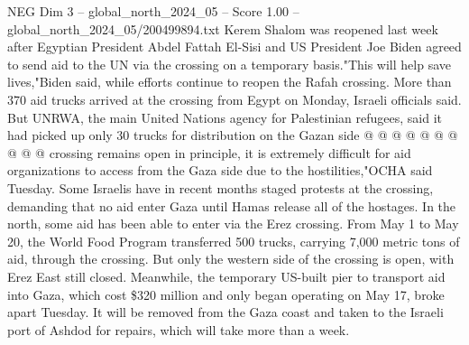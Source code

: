 \begin{textsample}{NEG Dim 3 – global\_north\_2024\_05 – Score 1.00 – global\_north\_2024\_05/200499894.txt}
Kerem Shalom was reopened last week after Egyptian President Abdel Fattah El-Sisi and US President Joe Biden agreed to send aid to the UN via the crossing on a temporary basis."This will help save lives,"Biden said, while efforts continue to reopen the Rafah crossing.
More than 370 aid trucks arrived at the crossing from Egypt on Monday, Israeli officials said.
But UNRWA, the main United Nations agency for Palestinian refugees, said it had picked up only 30 trucks for distribution on the Gazan side @ @ @ @ @ @ @ @ @ @ crossing remains open in principle, it is extremely difficult for aid organizations to access from the Gaza side due to the hostilities,"OCHA said Tuesday.
Some Israelis have in recent months staged protests at the crossing, demanding that no aid enter Gaza until Hamas release all of the hostages.
In the north, some aid has been able to enter via the Erez crossing.
From May 1 to May 20, the World Food Program transferred 500 trucks, carrying 7,000 metric tons of aid, through the crossing.
But only the western side of the crossing is open, with Erez East still closed.
Meanwhile, the temporary US-built pier to transport aid into Gaza, which cost \$320 million and only began operating on May 17, broke apart Tuesday.
It will be removed from the Gaza coast and taken to the Israeli port of Ashdod for repairs, which will take more than a week.

\end{textsample}
